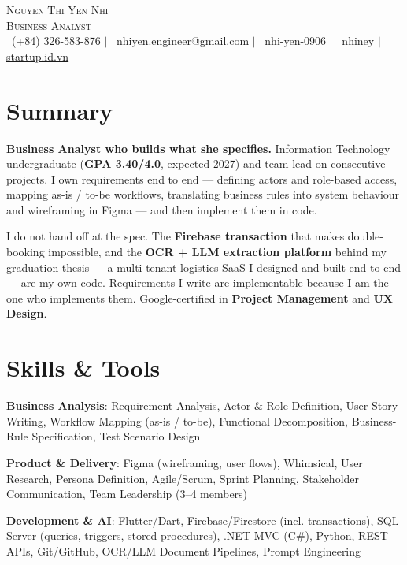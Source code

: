 \documentclass[a4paper,9pt]{extarticle}
\begin{document}
\begin{center}
  {\Huge\scshape Nguyen Thi Yen Nhi}\\ \vspace{3pt}
  {\large\scshape Business Analyst}\\ \vspace{5pt}
  \small
  \, (+84) 326-583-876 $|$
  \href{mailto:nhiyen.engineer@gmail.com}{\, nhiyen.engineer@gmail.com} $|$
  \href{https://linkedin.com/in/nhi-yen-0906}{\, nhi-yen-0906} $|$
  \href{https://github.com/nhiney}{\, nhiney} $|$
  \href{https://startup.id.vn/}{\, startup.id.vn}
\end{center}

\section{Summary}
\begin{cvPlain}
  \item \textbf{Business Analyst who builds what she specifies.} Information Technology undergraduate (\textbf{GPA 3.40/4.0}, expected 2027) and team lead on consecutive projects. I own requirements end to end — defining actors and role-based access, mapping as-is / to-be workflows, translating business rules into system behaviour and wireframing in Figma — and then implement them in code.
  \item I do not hand off at the spec. The \textbf{Firebase transaction} that makes double-booking impossible, and the \textbf{OCR + LLM extraction platform} behind my graduation thesis — a multi-tenant logistics SaaS I designed and built end to end — are my own code. Requirements I write are implementable because I am the one who implements them. Google-certified in \textbf{Project Management} and \textbf{UX Design}.
\end{cvPlain}

\section{Skills \& Tools}
\begin{cvPlain}
  \item \textbf{Business Analysis}{: Requirement Analysis, Actor \& Role Definition, User Story Writing, Workflow Mapping (as-is / to-be), Functional Decomposition, Business-Rule Specification, Test Scenario Design}
  \item \textbf{Product \& Delivery}{: Figma (wireframing, user flows), Whimsical, User Research, Persona Definition, Agile/Scrum, Sprint Planning, Stakeholder Communication, Team Leadership (3--4 members)}
  \item \textbf{Development \& AI}{: Flutter/Dart, Firebase/Firestore (incl. transactions), SQL Server (queries, triggers, stored procedures), .NET MVC (C\#), Python, REST APIs, Git/GitHub, OCR/LLM Document Pipelines, Prompt Engineering}
\end{cvPlain}
\end{document}
